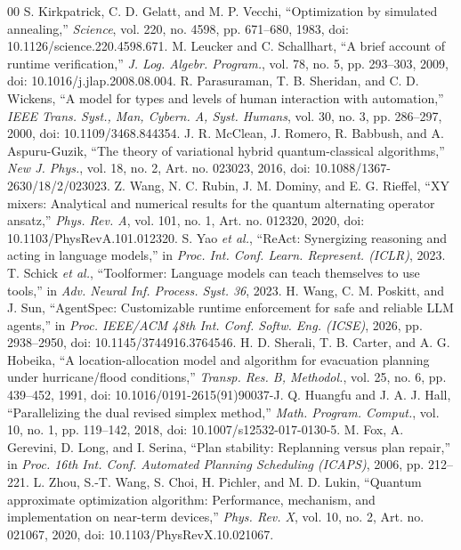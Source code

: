 \documentclass[conference]{IEEEtran}
\begin{document}
\begin{thebibliography}{00}
 S. Kirkpatrick, C. D. Gelatt, and M. P. Vecchi, ``Optimization by simulated annealing,'' \textit{Science}, vol. 220, no. 4598, pp. 671--680, 1983, doi: 10.1126/science.220.4598.671.
 M. Leucker and C. Schallhart, ``A brief account of runtime verification,'' \textit{J. Log. Algebr. Program.}, vol. 78, no. 5, pp. 293--303, 2009, doi: 10.1016/j.jlap.2008.08.004.
 R. Parasuraman, T. B. Sheridan, and C. D. Wickens, ``A model for types and levels of human interaction with automation,'' \textit{IEEE Trans. Syst., Man, Cybern. A, Syst. Humans}, vol. 30, no. 3, pp. 286--297, 2000, doi: 10.1109/3468.844354.
 J. R. McClean, J. Romero, R. Babbush, and A. Aspuru-Guzik, ``The theory of variational hybrid quantum-classical algorithms,'' \textit{New J. Phys.}, vol. 18, no. 2, Art. no. 023023, 2016, doi: 10.1088/1367-2630/18/2/023023.
 Z. Wang, N. C. Rubin, J. M. Dominy, and E. G. Rieffel, ``XY mixers: Analytical and numerical results for the quantum alternating operator ansatz,'' \textit{Phys. Rev. A}, vol. 101, no. 1, Art. no. 012320, 2020, doi: 10.1103/PhysRevA.101.012320.
 S. Yao \textit{et al.}, ``ReAct: Synergizing reasoning and acting in language models,'' in \textit{Proc. Int. Conf. Learn. Represent. (ICLR)}, 2023.
 T. Schick \textit{et al.}, ``Toolformer: Language models can teach themselves to use tools,'' in \textit{Adv. Neural Inf. Process. Syst. 36}, 2023.
 H. Wang, C. M. Poskitt, and J. Sun, ``AgentSpec: Customizable runtime enforcement for safe and reliable LLM agents,'' in \textit{Proc. IEEE/ACM 48th Int. Conf. Softw. Eng. (ICSE)}, 2026, pp. 2938--2950, doi: 10.1145/3744916.3764546.
 H. D. Sherali, T. B. Carter, and A. G. Hobeika, ``A location-allocation model and algorithm for evacuation planning under hurricane/flood conditions,'' \textit{Transp. Res. B, Methodol.}, vol. 25, no. 6, pp. 439--452, 1991, doi: 10.1016/0191-2615(91)90037-J.
 Q. Huangfu and J. A. J. Hall, ``Parallelizing the dual revised simplex method,'' \textit{Math. Program. Comput.}, vol. 10, no. 1, pp. 119--142, 2018, doi: 10.1007/s12532-017-0130-5.
 M. Fox, A. Gerevini, D. Long, and I. Serina, ``Plan stability: Replanning versus plan repair,'' in \textit{Proc. 16th Int. Conf. Automated Planning Scheduling (ICAPS)}, 2006, pp. 212--221.
 L. Zhou, S.-T. Wang, S. Choi, H. Pichler, and M. D. Lukin, ``Quantum approximate optimization algorithm: Performance, mechanism, and implementation on near-term devices,'' \textit{Phys. Rev. X}, vol. 10, no. 2, Art. no. 021067, 2020, doi: 10.1103/PhysRevX.10.021067.
\end{thebibliography}
\end{document}
